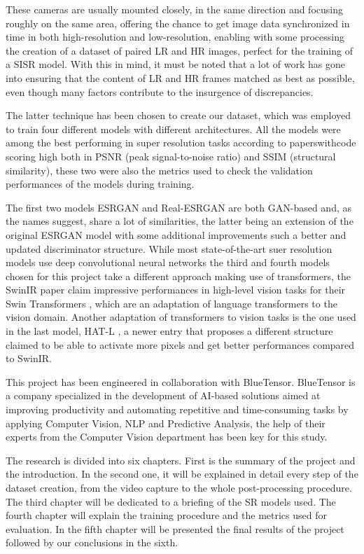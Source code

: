 These cameras are usually mounted closely, in the same direction and focusing roughly on the same area, offering the chance to get image data synchronized in time in both high-resolution and low-resolution, enabling with some processing the creation of a dataset of paired LR and HR images, perfect for the training of a SISR model. With this in mind, it must be noted that a lot of work has gone into ensuring that the content of LR and HR frames matched as best as possible, even though many factors contribute to the insurgence of discrepancies.

The latter technique has been chosen to create our dataset, which was employed to train four different models with different architectures. All the models were among the best performing in super resolution tasks according to paperswithcode \cite{pwcode} scoring high both in PSNR \cite{psnr} (peak signal-to-noise ratio) and SSIM \cite{ssim} (structural similarity), these two were also the metrics used to check the validation performances of the models during training.

The first two models ESRGAN \cite{wang2018esrgan} and Real-ESRGAN \cite{wang2021realesrgan} are both GAN-based and, as the names suggest, share a lot of similarities, the latter being an extension of the original ESRGAN model with some additional improvements such a better and updated discriminator structure. While most state-of-the-art suer resolution models use deep convolutional neural networks the third and fourth models chosen for this project take a different approach making use of transformers, the SwinIR \cite{liang2021swinir} paper claim impressive performances in high-level vision tasks for their Swin Transformers \cite{liu2021swin}, which are an adaptation of language transformers to the vision domain. Another adaptation of transformers to vision tasks is the one used in the last model, HAT-L \cite{chen2023activating}, a newer entry that proposes a different structure claimed to be able to activate more pixels and get better performances compared to SwinIR.

This project has been engineered in collaboration with BlueTensor. BlueTensor is a company specialized in the development of AI-based solutions aimed at improving productivity and automating repetitive and time-consuming tasks by applying Computer Vision, NLP and Predictive Analysis, the help of their experts from the Computer Vision department has been key for this study.

The research is divided into six chapters. First is the summary of the project and the introduction. In the second one, it will be explained in detail every step of the dataset creation, from the video capture to the whole post-processing procedure. The third chapter will be dedicated to a briefing of the SR models used. The fourth chapter will explain the training procedure and the metrics used for evaluation. In the fifth chapter will be presented the final results of the project followed by our conclusions in the sixth.

